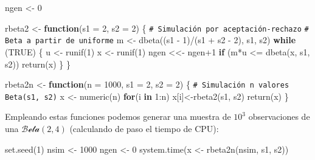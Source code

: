 \documentclass[
]{book}
\newenvironment{Shaded}{\begin{snugshade}}{\end{snugshade}}
\newcommand{\AttributeTok}[1]{\textcolor[rgb]{0.77,0.63,0.00}{#1}}
\newcommand{\CommentTok}[1]{\textcolor[rgb]{0.56,0.35,0.01}{\textit{#1}}}
\newcommand{\ConstantTok}[1]{\textcolor[rgb]{0.00,0.00,0.00}{#1}}
\newcommand{\ControlFlowTok}[1]{\textcolor[rgb]{0.13,0.29,0.53}{\textbf{#1}}}
\newcommand{\DecValTok}[1]{\textcolor[rgb]{0.00,0.00,0.81}{#1}}
\newcommand{\FunctionTok}[1]{\textcolor[rgb]{0.00,0.00,0.00}{#1}}
\newcommand{\NormalTok}[1]{#1}
\newcommand{\OtherTok}[1]{\textcolor[rgb]{0.56,0.35,0.01}{#1}}
\newcommand{\SpecialCharTok}[1]{\textcolor[rgb]{0.00,0.00,0.00}{#1}}
\theoremstyle{break}
\theoremstyle{nonumberplain}
\renewcommand{\CommentTok}[1]{\textcolor[rgb]{0.41,0.41,0.41}{\texttt{#1}}}
\begin{document}
\begin{Shaded}
\begin{Highlighting}[]
\NormalTok{ngen }\OtherTok{\textless{}{-}} \DecValTok{0} 

\NormalTok{rbeta2 }\OtherTok{\textless{}{-}} \ControlFlowTok{function}\NormalTok{(}\AttributeTok{s1 =} \DecValTok{2}\NormalTok{, }\AttributeTok{s2 =} \DecValTok{2}\NormalTok{) \{}
  \CommentTok{\# Simulación por aceptación{-}rechazo}
  \CommentTok{\# Beta a partir de uniforme}
\NormalTok{  m }\OtherTok{\textless{}{-}} \FunctionTok{dbeta}\NormalTok{((s1 }\SpecialCharTok{{-}} \DecValTok{1}\NormalTok{)}\SpecialCharTok{/}\NormalTok{(s1 }\SpecialCharTok{+}\NormalTok{ s2 }\SpecialCharTok{{-}} \DecValTok{2}\NormalTok{), s1, s2)}
  \ControlFlowTok{while}\NormalTok{ (}\ConstantTok{TRUE}\NormalTok{) \{}
\NormalTok{    u }\OtherTok{\textless{}{-}} \FunctionTok{runif}\NormalTok{(}\DecValTok{1}\NormalTok{)}
\NormalTok{    x }\OtherTok{\textless{}{-}} \FunctionTok{runif}\NormalTok{(}\DecValTok{1}\NormalTok{)}
\NormalTok{    ngen }\OtherTok{\textless{}\textless{}{-}}\NormalTok{ ngen}\SpecialCharTok{+}\DecValTok{1}
    \ControlFlowTok{if}\NormalTok{ (m}\SpecialCharTok{*}\NormalTok{u }\SpecialCharTok{\textless{}=} \FunctionTok{dbeta}\NormalTok{(x, s1, s2)) }\FunctionTok{return}\NormalTok{(x)}
\NormalTok{  \}}
\NormalTok{\}}

\NormalTok{rbeta2n }\OtherTok{\textless{}{-}} \ControlFlowTok{function}\NormalTok{(}\AttributeTok{n =} \DecValTok{1000}\NormalTok{, }\AttributeTok{s1 =} \DecValTok{2}\NormalTok{, }\AttributeTok{s2 =} \DecValTok{2}\NormalTok{) \{}
  \CommentTok{\# Simulación n valores Beta(s1, s2)}
\NormalTok{  x }\OtherTok{\textless{}{-}} \FunctionTok{numeric}\NormalTok{(n)}
  \ControlFlowTok{for}\NormalTok{(i }\ControlFlowTok{in} \DecValTok{1}\SpecialCharTok{:}\NormalTok{n) x[i]}\OtherTok{\textless{}{-}}\FunctionTok{rbeta2}\NormalTok{(s1, s2)}
  \FunctionTok{return}\NormalTok{(x)}
\NormalTok{\}}
\end{Highlighting}
\end{Shaded}

Empleando estas funciones podemos generar una muestra de \(10^3\) observaciones de una \(\mathcal{Beta}(2, 4)\) (calculando de paso el tiempo de CPU):

\begin{Shaded}
\begin{Highlighting}[]
\FunctionTok{set.seed}\NormalTok{(}\DecValTok{1}\NormalTok{)}
\NormalTok{nsim }\OtherTok{\textless{}{-}} \DecValTok{1000}
\NormalTok{ngen }\OtherTok{\textless{}{-}} \DecValTok{0}
\FunctionTok{system.time}\NormalTok{(x }\OtherTok{\textless{}{-}} \FunctionTok{rbeta2n}\NormalTok{(nsim, s1, s2))}
\end{Highlighting}
\end{Shaded}
\end{document}
